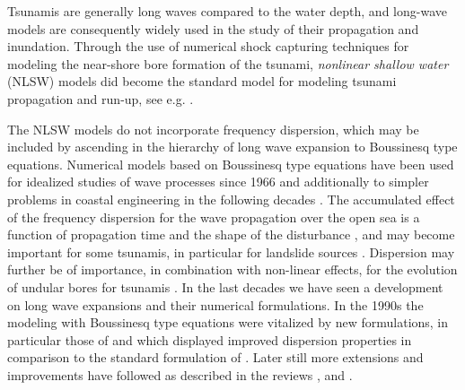 \documentclass[review]{elsarticle}
\begin{document}
Tsunamis are  generally long waves compared to the water depth, and 
long-wave models are consequently widely used in the study of their propagation and inundation.
Through the use of numerical shock capturing techniques for modeling
the near-shore bore formation of the tsunami, {\em nonlinear shallow water} (NLSW) models
did become the standard model for modeling tsunami propagation and run-up, see e.g. 
\citep{titov1995modeling,Imamura1996b,Harig2008,BergerGeorgeLeVequeMandli11}.

The  NLSW models do not incorporate frequency dispersion, which may be included by ascending in the hierarchy of long wave expansion 
to Boussinesq type equations. 
Numerical models based on Boussinesq type equations have been used
for idealized studies of wave processes since 1966 \citep{Peregrine:1966} and 
additionally to simpler problems in coastal engineering in the following decades \citep{Brocchini:2013}. 
The accumulated effect of the frequency dispersion for the wave propagation over the open sea is 
a function of propagation time and the shape of the disturbance \citep{Glimsdal2013},
and may become important for some tsunamis, in particular for landslide sources \citep{Lovholt2015}. 
Dispersion may further be of importance, in combination with non-linear effects,
for the evolution of undular bores for tsunamis \citep{Glimsdal2013,Grue:2008,Lovholt:2008b,Behrens2015}.
In the last decades we have seen a development on long wave expansions and their numerical formulations. 
In the 1990s the modeling with  Boussinesq type equations were vitalized by 
new formulations, in particular those of  \cite{madsen1992new} and \cite{nwogu1993alternative} which  displayed improved dispersion properties in comparison to the standard formulation of \cite{peregrine1967long}.
Later still more extensions and improvements have followed as described in the reviews \cite{Madsen:2003a}, \cite{Brocchini:2013} and \cite{Kirby:2016}.
\end{document}
